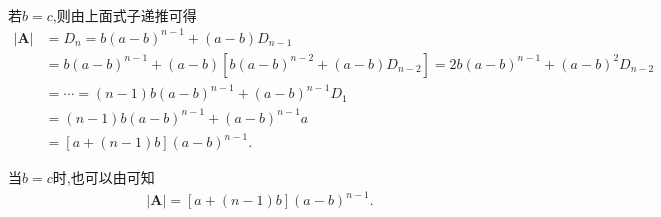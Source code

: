 \documentclass[../../main.tex]{subfiles}%
\begin{document}
\begin{solution}
\begin{align*}
\nonumber
\end{align*}
若$b=c$,则由上面式子递推可得
\begin{align*}
\left| \boldsymbol{A} \right|&=D_n=b\left( a-b \right) ^{n-1}+\left( a-b \right) D_{n-1}
\\
&=b\left( a-b \right) ^{n-1}+\left( a-b \right) \left[ b\left( a-b \right) ^{n-2}+\left( a-b \right) D_{n-2} \right] 
=2b\left( a-b \right) ^{n-1}+\left( a-b \right) ^2D_{n-2}
\\
&=\cdots =\left( n-1 \right) b\left( a-b \right) ^{n-1}+\left( a-b \right) ^{n-1}D_1
\\
&=\left( n-1 \right) b\left( a-b \right) ^{n-1}+\left( a-b \right) ^{n-1}a
\\
&=\left[ a+\left( n-1 \right) b \right] \left( a-b \right) ^{n-1}.
\end{align*}

当$b=c$时,也可以由可知
\begin{align*}
|\boldsymbol{A}|=\left[ a+\left( n-1 \right) b \right] \left( a-b \right) ^{n-1}.
\nonumber
\end{align*}

\end{solution}
\end{document}
